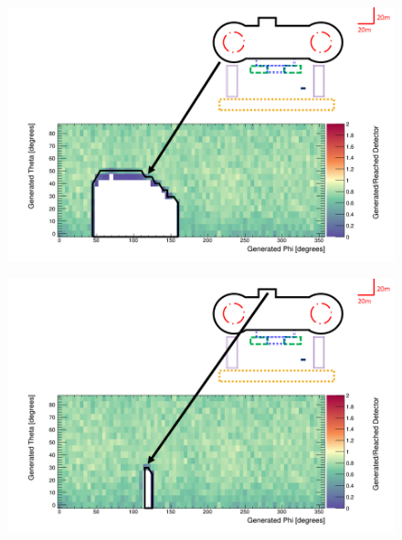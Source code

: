 \begin{figure}[htbp]
 \centering
 \includegraphics[width=\linewidth]{Chapter5/Figs/wylfaRasterNew/dogBoneGen_Reached.png}
 \label{fig:dogBoneGen_Reached}
\end{figure}

\begin{figure}[htbp]
 \centering
 \includegraphics[width=\linewidth]{Chapter5/Figs/wylfaRasterNew/backServiceGen_Reached.png}
 \label{fig:backServiceGen_Reached}
\end{figure}

